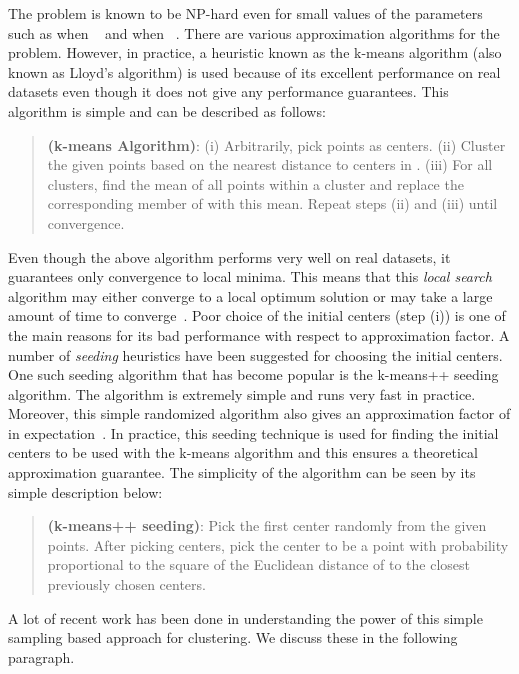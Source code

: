 \documentclass[11pt]{article}
\begin{document}
The problem is known to be NP-hard even for small values of the parameters such as when ~\cite{d07} and when ~\cite{v09,mnv12}.
There are various approximation algorithms for the problem.
However, in practice, a heuristic known as the k-means algorithm (also known as Lloyd's algorithm) is used because of its excellent performance on real datasets even though it does not give any performance guarantees. 
This algorithm is simple and can be described as follows: 
\begin{quote}
{\bf (k-means Algorithm)}: (i) Arbitrarily, pick  points  as centers. (ii) Cluster the given points based on the nearest distance to centers in . (iii) For all clusters, find the mean of all points within a cluster and replace the corresponding member of  with this mean. Repeat steps (ii) and (iii) until convergence.
\end{quote}

Even though the above algorithm performs very well on real datasets, it guarantees only convergence to local minima.
This means that this {\em local search} algorithm may either converge to a local optimum solution or may take a large amount of time to converge~\cite{ArthurV06,ArthurV06b}. 
Poor choice of the initial  centers (step (i)) is one of the main reasons for its bad performance with respect to approximation factor. 
A number of {\em seeding} heuristics have been suggested for choosing the initial centers. 
One such seeding algorithm that has become popular is the k-means++ seeding algorithm.
The algorithm is extremely simple and runs very fast in practice.
Moreover, this simple randomized algorithm also gives an approximation factor of  in expectation~\cite{ArthurV07}.
In practice, this seeding technique is used for finding the initial  centers to be used with the k-means algorithm and this ensures a theoretical approximation guarantee.
The simplicity of the algorithm can be seen by its simple description below:
\begin{quote}
{\bf (k-means++ seeding)}: Pick the first center randomly from the given points. 
After picking  centers, pick the  center to be a point  with probability proportional to the square of the Euclidean distance of  to the closest previously  chosen centers.
\end{quote}

A lot of recent work has been done in understanding the power of this simple sampling based approach for clustering.
We discuss these in the following paragraph.
\end{document}
